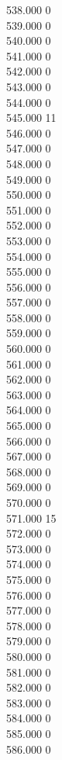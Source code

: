{ 538.000	0 \\
 539.000	0 \\
 540.000	0 \\
 541.000	0 \\
 542.000	0 \\
 543.000	0 \\
 544.000	0 \\
 545.000	11 \\
 546.000	0 \\
 547.000	0 \\
 548.000	0 \\
 549.000	0 \\
 550.000	0 \\
 551.000	0 \\
 552.000	0 \\
 553.000	0 \\
 554.000	0 \\
 555.000	0 \\
 556.000	0 \\
 557.000	0 \\
 558.000	0 \\
 559.000	0 \\
 560.000	0 \\
 561.000	0 \\
 562.000	0 \\
 563.000	0 \\
 564.000	0 \\
 565.000	0 \\
 566.000	0 \\
 567.000	0 \\
 568.000	0 \\
 569.000	0 \\
 570.000	0 \\
 571.000	15 \\
 572.000	0 \\
 573.000	0 \\
 574.000	0 \\
 575.000	0 \\
 576.000	0 \\
 577.000	0 \\
 578.000	0 \\
 579.000	0 \\
 580.000	0 \\
 581.000	0 \\
 582.000	0 \\
 583.000	0 \\
 584.000	0 \\
 585.000	0 \\
 586.000	0 \\
}
